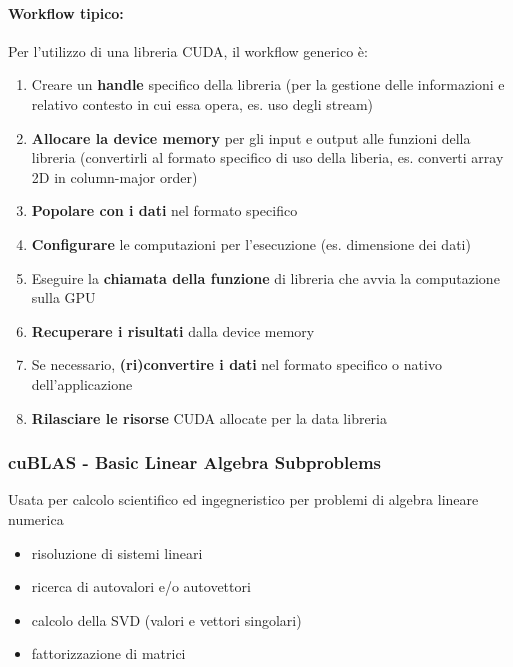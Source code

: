 \paragraph{Workflow tipico:} Per l'utilizzo di una libreria CUDA, il workflow generico è:
\begin{enumerate}
	\item Creare un \textbf{handle} specifico della libreria (per la gestione delle informazioni e relativo contesto in cui essa opera, es. uso degli stream)
	
	\item \textbf{Allocare la device memory} per gli input e output alle funzioni della libreria (convertirli al formato specifico di uso della liberia, es. converti array 2D in column-major order)
	
	\item \textbf{Popolare con i dati} nel formato specifico
	
	\item \textbf{Configurare} le computazioni per l'esecuzione (es. dimensione dei dati)
	
	\item Eseguire la \textbf{chiamata della funzione} di libreria che avvia la computazione sulla GPU
	
	\item \textbf{Recuperare i risultati} dalla device memory
	
	\item Se necessario, \textbf{(ri)convertire i dati} nel formato specifico o nativo dell'applicazione
	
	\item \textbf{Rilasciare le risorse} CUDA allocate per la data libreria
\end{enumerate}

\subsubsection{cuBLAS - Basic Linear Algebra Subproblems}

Usata per calcolo scientifico ed ingegneristico per problemi di algebra lineare numerica
\begin{itemize}
	\item risoluzione di sistemi lineari
	
	\item ricerca di autovalori e/o autovettori
	
	\item calcolo della SVD (valori e vettori singolari)
	
	\item fattorizzazione di matrici
\end{itemize}

